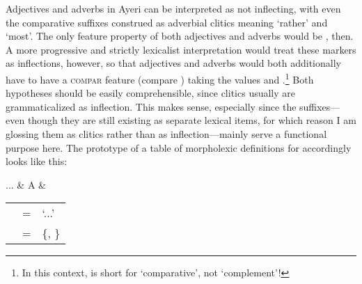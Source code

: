 Adjectives and adverbs in Ayeri can be interpreted as not inflecting, with even
the comparative suffixes construed as adverbial clitics meaning `rather' and
`most'. The only feature property of both adjectives and adverbs would be 
\Pred{}, then. A more progressive and strictly lexicalist interpretation would
treat these markers as inflections, however, so that adjectives and adverbs 
would both additionally have to have a \textsc{compar} feature (compare 
\cite[Feature Table]{pargram}) taking the values \Comp{} and \Supl{}.\footnote{%
In this context, \Comp{} is short for `comparative', not `complement'!} Both
hypotheses should be easily comprehensible, since clitics usually are 
grammaticalized as inflection. This makes sense, especially since the 
suffixes---even though they are still existing as separate lexical
items, for which reason I am glossing them as clitics rather than
as inflection---mainly serve a functional purpose here. The prototype of a 
table of morpholexic definitions for  accordingly looks like this:

\ex \begin{tabu}[t] {}
	...
		& A
		& \begin{tabular}[t]{l l l}
			\ups{\Pred} & = & `...' \\
			\ups{\Compar} & = & \{\Comp{}, \Supl{}\} \\
		\end{tabular}
	\end{tabu}

\xe

